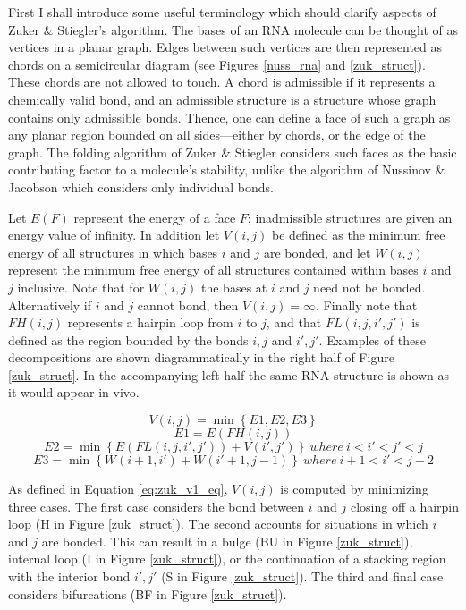 \documentclass[12pt, a4paper]{article}
\begin{document}
First I shall introduce some useful terminology which should clarify aspects of Zuker \& Stiegler’s
algorithm. The bases of an RNA molecule can be thought of as vertices in a planar graph. Edges between such vertices are then represented as chords on a semicircular diagram (see Figures \ref{nuss_rna} and \ref{zuk_struct}). These chords are not allowed to touch. A chord
is admissible if it represents a chemically valid bond, and an
admissible structure is a structure whose graph contains only admissible bonds.
Thence, one can define a face of such a graph as any planar region bounded on all
sides---either by chords, or the edge of the graph. The
folding algorithm of Zuker \& Stiegler considers such faces as the basic contributing factor to a molecule's stability, unlike the algorithm of Nussinov \& Jacobson
which considers only individual bonds.


Let $E(F)$ represent the energy of a face $F$; inadmissible structures are given
an energy value of infinity. In addition let $V(i, j)$ be defined as the minimum free
energy of all structures in which bases $i$ and $j$ are bonded, and let $W(i, j)$ represent
the minimum free energy of all structures contained within bases $i$ and $j$ inclusive.
Note that for $W(i, j)$ the bases at $i$ and $j$ need not be bonded. Alternatively if $i$ and $j$ cannot bond, then $V(i, j) = \infty $. Finally note that $FH(i, j)$ represents a
hairpin loop from $i$ to $j$, and that $FL(i, j, i' , j' )$ is defined as the region
bounded by the bonds $i, j$ and $i', j'$. Examples of these decompositions are shown
diagrammatically in the right half of Figure \ref{zuk_struct}. In the accompanying left
half the same RNA structure is shown as it would appear in vivo.

\begin{equation} \label{eq:zuk_v1_eq}
V(i, j) = \min \left\lbrace E1, E2, E3 \right\rbrace
\end{equation}
$$E1 = E(FH(i, j))$$
$$E2 = \min \left\lbrace E(FL(i, j, i', j')) + V (i', j') \right\rbrace \: where \: i < i' < j' < j$$
$$E3 = \min \left\lbrace W (i + 1, i') + W (i' + 1, j - 1) \right\rbrace \: where \: i + 1 < i' < j - 2$$


As defined in Equation \ref{eq:zuk_v1_eq}, $V (i, j)$ is computed by minimizing
three cases. The first case considers the bond between $i$ and $j$ closing off a hairpin
loop (H in Figure \ref{zuk_struct}). The second accounts for situations in which $i$ and $j$ are bonded. This can result in a bulge (BU in Figure \ref{zuk_struct}), internal loop (I in Figure \ref{zuk_struct}), or the continuation of a stacking region with the
interior bond $i',j'$ (S in Figure \ref{zuk_struct}). The third and final case considers bifurcations
(BF in Figure \ref{zuk_struct}).
\end{document}
